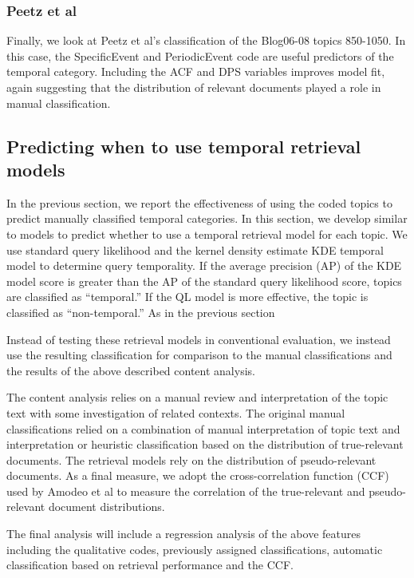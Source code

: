 \documentclass{sig-alternate}
\begin{document}
\subsubsection{Peetz et al}
Finally, we look at Peetz et al's classification of the Blog06-08 topics 850-1050. In this case, the SpecificEvent and PeriodicEvent code are useful predictors of the temporal category. Including the ACF and DPS variables improves model fit, again suggesting that the distribution of relevant documents played a role in manual classification.

\subsection{Predicting when to use temporal retrieval models}

In the previous section, we report the effectiveness of using the coded topics to predict manually classified temporal categories. In this section, we develop similar to models to predict whether to use a temporal retrieval model for each topic. We use standard query likelihood \cite{XXX} and the kernel density estimate {KDE} temporal model \cite{Efron2014} to determine query temporality. If the average precision (AP) of the KDE model score is greater than the AP of the standard query likelihood score, topics are classified as ``temporal.''  If the QL model is more effective, the topic is classified as ``non-temporal.'' As in the previous section

Instead of testing these retrieval models in conventional evaluation, we instead use the resulting classification for comparison to the manual classifications and the results of the above described content analysis.

The content analysis relies on a manual review and interpretation of the topic text with some investigation of related contexts. The original manual classifications relied on a combination of manual interpretation of topic text and interpretation or heuristic classification based on the distribution of true-relevant documents. The retrieval models rely on the distribution of pseudo-relevant documents. As a final measure, we adopt the cross-correlation function (CCF) used by Amodeo et al \cite{Amodeo2011} to measure the correlation of the true-relevant and pseudo-relevant document distributions. 

The final analysis will include a regression analysis of the above features including the qualitative codes, previously assigned classifications, automatic classification based on retrieval performance and the CCF.
\end{document}
